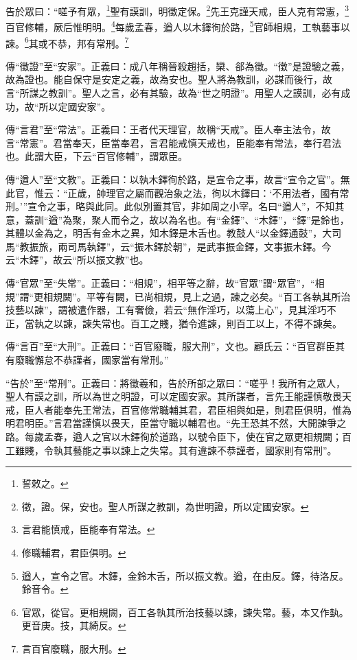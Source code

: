 告於眾曰：“嗟予有眾，\footnote{誓敕之。}聖有謨訓，明徵定保。\footnote{徵，證。保，安也。聖人所謀之教訓，為世明證，所以定國安家。}先王克謹天戒，臣人克有常憲，\footnote{言君能慎戒，臣能奉有常法。}百官修輔，厥后惟明明。\footnote{修職輔君，君臣俱明。}每歲孟春，遒人以木鐸徇於路，\footnote{遒人，宣令之官。木鐸，金鈴木舌，所以振文教。遒，在由反。鐸，待洛反。鈴音令。}官師相規，工執藝事以諫。\footnote{官眾，從官。更相規闕，百工各執其所治技藝以諫，諫失常。藝，本又作埶。更音庚。技，其綺反。}其或不恭，邦有常刑。\footnote{言百官廢職，服大刑。}

{\noindent\zhuan{}\fzbyks 傳“徵證”至“安家”。正義曰：成八年稱晉殺趙括，欒、郤為徵。“徵”是證驗之義，故為證也。能自保守是安定之義，故為安也。聖人將為教訓，必謀而後行，故言“所謀之教訓”。聖人之言，必有其驗，故為“世之明證”。用聖人之謨訓，必有成功，故“所以定國安家”。 \par}

{\noindent\zhuan{}\fzbyks 傳“言君”至“常法”。正義曰：王者代天理官，故稱“天戒”。臣人奉主法令，故言“常憲”。君當奉天，臣當奉君，言君能戒慎天戒也，臣能奉有常法，奉行君法也。此謂大臣，下云“百官修輔”，謂眾臣。 \par}

{\noindent\zhuan{}\fzbyks 傳“遒人”至“文教”。正義曰：以執木鐸徇於路，是宣令之事，故言“宣令之官”。無此官，惟云：“正歲，帥理官之屬而觀治象之法，徇以木鐸曰：‘不用法者，國有常刑。’”宣令之事，略與此同。此似別置其官，非如周之小宰。名曰“遒人”，不知其意，蓋訓“遒”為聚，聚人而令之，故以為名也。有“金鐸”、“木鐸”，“鐸”是鈴也，其體以金為之，明舌有金木之異，知木鐸是木舌也。教鼓人“以金鐸通鼓”，大司馬“教振旅，兩司馬執鐸”，云“振木鐸於朝”，是武事振金鐸，文事振木鐸。今云“木鐸”，故云“所以振文教”也。 \par}

{\noindent\zhuan{}\fzbyks 傳“官眾”至“失常”。正義曰：“相規”，相平等之辭，故“官眾”謂“眾官”，“相規”謂“更相規闕”。平等有闕，已尚相規，見上之過，諫之必矣。“百工各執其所治技藝以諫”，謂被遣作器，工有奢儉，若云“無作淫巧，以蕩上心”，見其淫巧不正，當執之以諫，諫失常也。百工之賤，猶令進諫，則百工以上，不得不諫矣。 \par}

{\noindent\zhuan{}\fzbyks 傳“言百”至“大刑”。正義曰：“百官廢職，服大刑”，文也。顧氏云：“百官群臣其有廢職懈怠不恭謹者，國家當有常刑。” \par}

{\noindent\shu{}\fzkt “告於”至“常刑”。正義曰：將徵羲和，告於所部之眾曰：“嗟乎！我所有之眾人，聖人有謨之訓，所以為世之明證，可以定國安家。其所謀者，言先王能謹慎敬畏天戒，臣人者能奉先王常法，百官修常職輔其君，君臣相與如是，則君臣俱明，惟為明君明臣。”言君當謹慎以畏天，臣當守職以輔君也。“先王恐其不然，大開諫爭之路。每歲孟春，遒人之官以木鐸徇於道路，以號令臣下，使在官之眾更相規闕；百工雖賤，令執其藝能之事以諫上之失常。其有違諫不恭謹者，國家則有常刑”。 \par}

